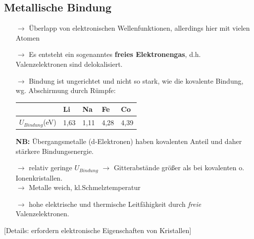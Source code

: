 \subsection{Metallische Bindung} %
\label{kap:1_5}
\begin{itemize}
	\item[$\rightarrow$] Überlapp von elektronischen Wellenfunktionen, allerdings hier mit vielen Atomen
	\item[$\rightarrow$] Es entsteht ein sogenanntes \textbf{freies Elektronengas}, d.h. Valenzelektronen sind delokalisiert.
	\item[$\rightarrow$] Bindung ist ungerichtet und nicht so stark, wie die kovalente Bindung, wg. Abschirmung durch Rümpfe:
	\begin{table}[H]
		\centering
		\begin{tabular}{l|l|l|l|l}
						 & Li   & Na   & Fe   & Co   \\
						 \hline
		$U_{Bindung}$(eV) & 1,63 & 1,11 & 4,28 & 4,39 \\    
		\end{tabular}
		\end{table}
	\textbf{NB:} Übergangsmetalle (d-Elektronen)  haben kovalenten Anteil und daher stärkere Bindungsenergie.
	\item[$\rightarrow$] relativ geringe $U_{Bindung}$ $\rightarrow$ Gitterabstände größer als bei kovalenten o. Ionenkristallen.\\
	$\rightarrow$ Metalle weich, kl.Schmelztemperatur
	\item[$\rightarrow$] hohe elektrische und thermische Leitfähigkeit durch \textit{freie} Valenzelektronen.
\end{itemize}
[Details: erfordern elektronische Eigenschaften von Kristallen]

